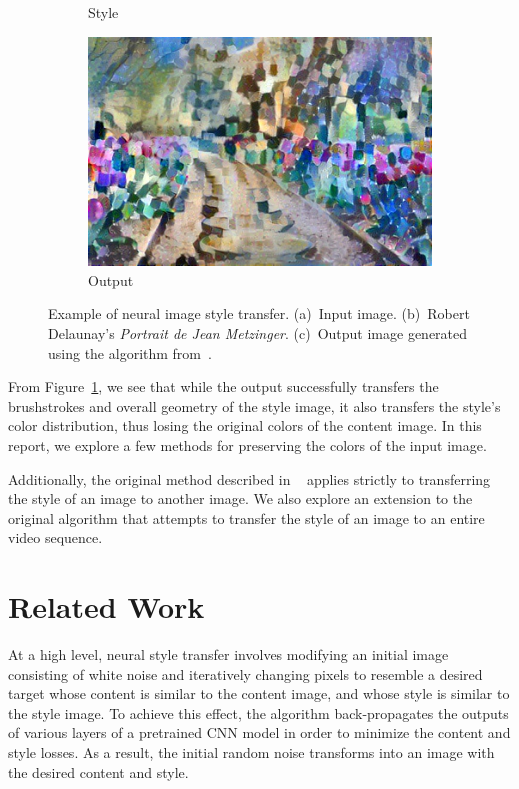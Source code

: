 \documentclass[10pt,twocolumn,letterpaper]{article}
\begin{document}
\begin{figure}[ht]
\begin{subfigure}[b]{0.19\linewidth}
  \caption{Style}
\end{subfigure}
\quad
\begin{subfigure}[b]{0.38\linewidth}
  \centering
  \includegraphics[width=\linewidth]{imgs/flowers-delaunay.jpg}
  \caption{Output}
\end{subfigure}
\caption{Example of neural image style transfer. (a)~Input image. (b)~Robert Delaunay's \textit{Portrait de Jean Metzinger}. (c)~Output image generated using the algorithm from~\cite{gatys-orig}.}
\label{fig:orig}
\end{figure}

From Figure~\ref{fig:orig}, we see that while the output successfully transfers the brushstrokes and overall geometry of the style image, it also transfers the style's color distribution, thus losing the original colors of the content image. In this report, we explore a few methods for preserving the colors of the input image.

Additionally, the original method described in ~\cite{gatys-orig} applies strictly to transferring the style of an image to another image. We also explore an extension to the original algorithm that attempts to transfer the style of an image to an entire video sequence.

\section{Related Work}
At a high level, neural style transfer involves modifying an initial image consisting of white noise and iteratively changing pixels to resemble a desired target whose content is similar to the content image, and whose style is similar to the style image. To achieve this effect, the algorithm back-propagates the outputs of various layers of a pretrained CNN model in order to minimize the content and style losses. As a result, the initial random noise transforms into an image with the desired content and style.
\end{document}

